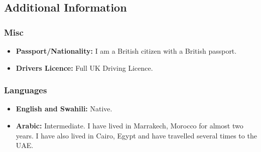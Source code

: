 \documentclass[
  a4paper,
]{article}
\providecommand{\tightlist}{%
  \setlength{\itemsep}{0pt}\setlength{\parskip}{0pt}}
\begin{document}
\begin{multicols*}{2}
\hypertarget{additional-information}{%
\subsection{Additional Information}\label{additional-information}}

\hypertarget{misc}{%
\subsubsection{Misc}\label{misc}}

\begin{itemize}
\tightlist
\item
  \textbf{Passport/Nationality:} I am a British citizen with a British
  passport.
\item
  \textbf{Drivers Licence:} Full UK Driving Licence.
\end{itemize}

\hypertarget{languages}{%
\subsubsection{Languages}\label{languages}}

\begin{itemize}
\tightlist
\item
  \textbf{English and Swahili:} Native.
\item
  \textbf{Arabic:} Intermediate. I have lived in Marrakech, Morocco for
  almost two years. I have also lived in Cairo, Egypt and have travelled
  several times to the UAE.
\end{itemize}

\end{multicols*}
\end{document}
